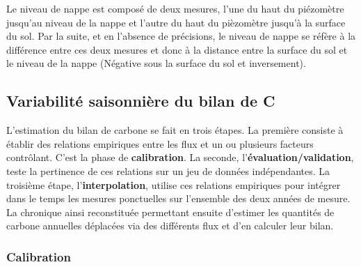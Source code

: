 Le niveau de nappe est composé de deux mesures, l'une du haut du piézomètre jusqu'au niveau de la nappe et l'autre du haut du pièzomètre jusqu'à la surface du sol. 
Par la suite, et en l'absence de précisions, le niveau de nappe se réfère à la différence entre ces deux mesures et donc à la distance entre la surface du sol et le niveau de la nappe (Négative sous la surface du sol et inversement).

\subsection{Variabilité saisonnière du bilan de C}

L'estimation du bilan de carbone se fait en trois étapes.
La première consiste à établir des relations empiriques entre les flux et un ou plusieurs facteurs contrôlant.
C'est la phase de \textbf{calibration}.
La seconde, l'\textbf{évaluation/validation}, teste la pertinence de ces relations sur un jeu de données indépendantes.
La troisième étape, l'\textbf{interpolation}, utilise ces relations empiriques pour intégrer dans le temps les mesures ponctuelles sur l'ensemble des deux années de mesure. 
La chronique ainsi reconstituée permettant ensuite d'estimer les quantités de carbone annuelles déplacées via des différents flux et d'en calculer leur bilan.

\subsubsection{Calibration}

